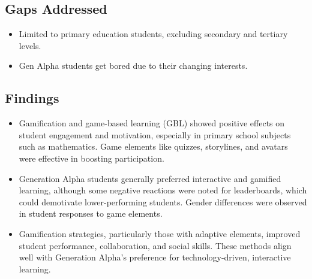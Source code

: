 \subsection{Gaps Addressed}
\begin{itemize}
    \item Limited to primary education students, excluding secondary and tertiary levels.
    \item Gen Alpha students get bored due to their changing interests.
\end{itemize}

\subsection{Findings}
\begin{itemize}
    \item Gamification and game-based learning (GBL) showed positive effects on student engagement and motivation, especially in primary school subjects such as mathematics. Game elements like quizzes, storylines, and avatars were effective in boosting participation.
    
    \item Generation Alpha students generally preferred interactive and gamified learning, although some negative reactions were noted for leaderboards, which could demotivate lower-performing students. Gender differences were observed in student responses to game elements.
    
    \item Gamification strategies, particularly those with adaptive elements, improved student performance, collaboration, and social skills. These methods align well with Generation Alpha’s preference for technology-driven, interactive learning.
\end{itemize}

